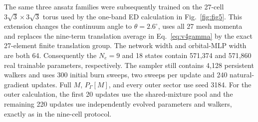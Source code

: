The same three ansatz families were subsequently trained on the 27-cell
$3\sqrt3\times3\sqrt3$ torus used by the one-band ED calculation in
Fig.~\ref{fig:fig5}.  This extension changes the continuum angle to
$\theta=2.6^\circ$, uses all 27 mesh momenta and replaces the nine-term
translation average in Eq.~\eqref{eq:v4gamma} by the exact 27-element finite
translation group.  The network width and orbital-MLP width are both 64.
Consequently the $N_e=9$ and 18 states contain 571,374 and 571,860 real
trainable parameters, respectively.  The sampler still contains 4,128
persistent walkers and uses 300 initial burn sweeps, two sweeps per update and
240 natural-gradient updates.  Full $M$, $P_\Gamma[M]$, and every outer sector
use seed 3184.  For the outer calculation, the first 20 updates use the
shared-mixture pool and the remaining 220 updates use independently evolved
parameters and walkers, exactly as in the nine-cell protocol.

\begin{table}[H]
\centering
\caption{Twenty-seven-cell final-ten training diagnostics. Energies and RMS
are meV per particle.  ``Reject'' counts attempted parameter updates rejected
by the explicit true-residual criterion.}
\label{tab:qns27-training}
\end{table}

